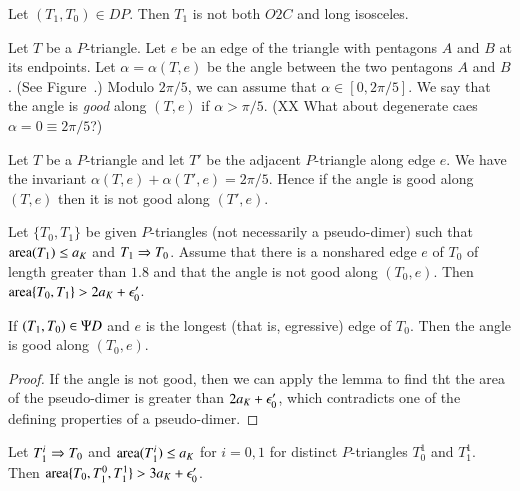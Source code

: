 \begin{lemma}
Let $(T_1,T_0)\in DP$.  Then $T_1$ is not both $O2C$  and long isosceles.
\end{lemma}

\begin{definition}\label{def:good}  Let $T$ be a $P$-triangle.  Let $e$ be an edge of the triangle with pentagons
$A$ and $B$ at its endpoints.
Let $\alpha = \alpha(T,e)$ be the angle between the two pentagons $A$ and $B$.  (See Figure~.)  Modulo
$2\pi/5$, we can assume that $\alpha\in  [0,2\pi/5]$.  We say that the angle is {\it good} along $(T,e)$ if $\alpha>\pi/5$.
(XX What about degenerate caes $\alpha = 0 \equiv 2\pi/5$?)
\end{definition}

Let $T$ be a $P$-triangle and let $T'$ be the adjacent $P$-triangle along edge $e$.  
We have the invariant $\alpha(T,e)+\alpha(T',e)=2\pi/5$.
Hence if the angle is good along $(T,e)$ then it is not good along $(T',e)$.


\begin{lemma}
Let $\{T_0,T_1\}$ be given $P$-triangles (not necessarily a pseudo-dimer) such that ${\operatorname{area}}(T_1)\le a_K$ and $T_1\Rightarrow T_0$.
Assume that there is a nonshared edge $e$ of $T_0$ of length greater than $1.8$ and that the angle is not good along $(T_0,e)$.
Then ${\operatorname{area}}\{T_0,T_1\} > 2a_K + \epsilon_0'$.
\end{lemma}

\begin{corollary}\label{lemma:good} If $(T_1,T_0)\in \Psi D$ and $e$ is the longest (that is, egressive) edge of $T_0$.  Then the angle
is good along $(T_0,e)$.
\end{corollary}

\begin{proof} If the angle is not good, then we can apply the lemma to find tht the area of the pseudo-dimer is
greater than $2a_K + \epsilon_0'$, which contradicts one of the defining properties of a pseudo-dimer.
\end{proof}


\begin{lemma}
Let $T_1^i\Rightarrow T_0$ and ${\operatorname{area}}(T_1^i)\le a_K$ for $i=0,1$ for distinct $P$-triangles $T^1_0$ and $T^1_1$.
Then ${\operatorname{area}}\{T_0,T^0_1,T^1_1\} > 3a_K + \epsilon_0'$.
\end{lemma}


